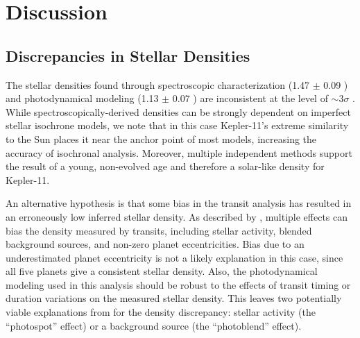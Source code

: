 \documentclass[oneside]{emulateapj}
\begin{document}
\begin{figure}
\centering
\caption{}
\label{fig:densities}
\end{figure}


\section{Discussion}
\label{s:discussion}
\subsection{Discrepancies in Stellar Densities}

The stellar densities found through spectroscopic characterization (1.47 $\pm$ 0.09 \gcm) and photodynamical modeling (1.13 $\pm$ 0.07 \gcm) are inconsistent at the level of $\sim$3$\sigma$ . While spectroscopically-derived densities can be strongly dependent on imperfect stellar isochrone models, we note that in this case Kepler-11's extreme similarity to the Sun places it near the anchor point of most models, increasing the accuracy of isochronal analysis. Moreover, multiple independent methods support the result of a young, non-evolved age and therefore a solar-like density for Kepler-11.

An alternative hypothesis is that some bias in the transit analysis has resulted in an erroneously low inferred stellar density. As described by \citet{Kipping2014}, multiple effects can bias the density measured by transits, including stellar activity, blended background sources, and non-zero planet eccentricities. Bias due to an underestimated planet eccentricity is not a likely explanation in this case, since all five planets give a consistent stellar density. Also, the photodynamical modeling used in this analysis should be robust to the effects of transit timing or duration variations on the measured stellar density. This leaves two potentially viable explanations from \citet{Kipping2014} for the density discrepancy: stellar activity (the ``photospot'' effect) or a background source (the ``photoblend'' effect).
\end{document}

